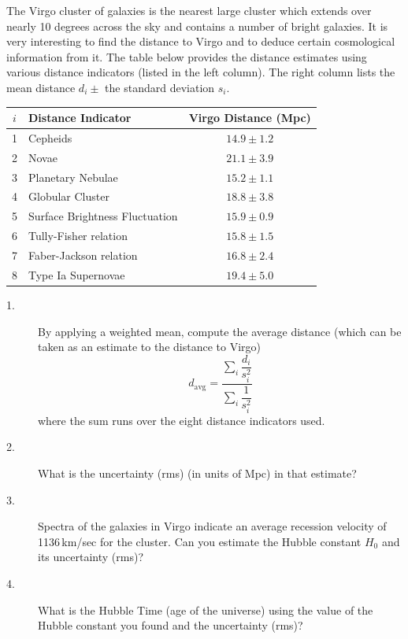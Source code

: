 The Virgo cluster of galaxies is the nearest large cluster which extends over
nearly 10 degrees across the sky and contains a number of bright galaxies. It
is very interesting to find the distance to Virgo and to deduce certain
cosmological information from it. The table below provides the distance
estimates using various distance indicators (listed in the left column). The
right column lists the mean distance $d_i \pm$ the standard deviation $s_i$.

\begin{center}
\begin{tabular}{cl c}
$i$ & Distance Indicator & Virgo Distance (Mpc) \\
\hline
1 & Cepheids                       & $14.9 \pm 1.2$ \\
2 & Novae                          & $21.1 \pm 3.9$ \\
3 & Planetary Nebulae              & $15.2 \pm 1.1$ \\
4 & Globular Cluster               & $18.8 \pm 3.8$ \\
5 & Surface Brightness Fluctuation & $15.9 \pm 0.9$ \\
6 & Tully-Fisher relation          & $15.8 \pm 1.5$ \\
7 & Faber-Jackson relation         & $16.8 \pm 2.4$ \\
8 & Type Ia Supernovae             & $19.4 \pm 5.0$ \\
\end{tabular}
\end{center}

\begin{description}
\item[1.] By applying a weighted mean, compute the average distance (which can
  be taken as an estimate to the distance to Virgo)
  \[ d_{\mathrm{avg}}
     = \frac{\sum_i \dfrac{d_i}{s_i^2}}{\sum_i \dfrac{1}{s_i^2}} \]
  where the sum runs over the eight distance indicators used.
\item[2.] What is the uncertainty (rms) (in units of Mpc) in that estimate?
\item[3.] Spectra of the galaxies in Virgo indicate an average recession
  velocity of 1136\,km/sec for the cluster. Can you estimate the Hubble
  constant $H_0$ and its uncertainty (rms)?
\item[4.] What is the Hubble Time (age of the universe) using the value of the
  Hubble constant you found and the uncertainty (rms)?
\end{description}

